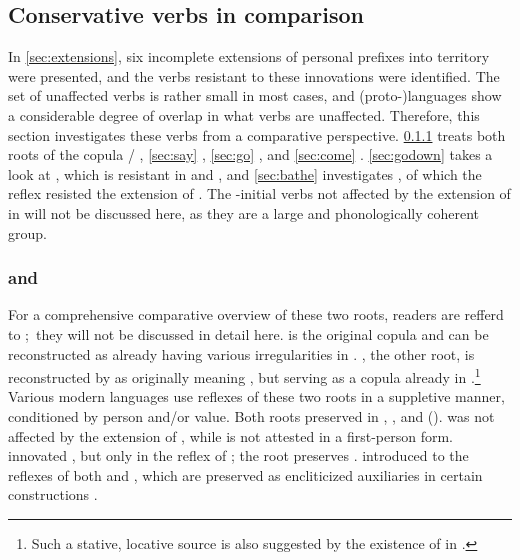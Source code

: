 \subsection{Conservative verbs in comparison}
\label{sec:verbs}
In \cref{sec:extensions}, six incomplete extensions of personal prefixes into  territory were presented, and the verbs resistant to these innovations were identified.
The set of unaffected verbs is rather small in most cases, and (proto-)languages show a considerable degree of overlap in what verbs are unaffected.
Therefore, this section investigates these verbs from a comparative perspective.
\cref{sec:be} treats both roots of the copula / , \cref{sec:say}  , \cref{sec:go}  , and \cref{sec:come}  .
\cref{sec:godown} takes a look at  , which is resistant in \PTir and \PPek, and  \cref{sec:bathe} investigates  , of which the \PPek reflex  resisted the extension of .
The -initial verbs not affected by the extension of  in \akuriyo {} will not be discussed here, as they are a large and phonologically coherent group.

\subsubsection{ and  }
\label{sec:be}
For a comprehensive comparative overview of these two roots, readers are refferd to \textcite[375--382]{gildea2018reconstructing}; they will not be discussed in detail here.
 is the original copula and can be reconstructed as already having various irregularities in \PC.
, the other root, is reconstructed by \textcites{meira2009property}{gildea2018reconstructing} as originally meaning , but serving as a copula already in \PC.\footnote{Such a stative, locative source is also suggested by the existence of   in \arara \parencite[196]{alves2017arara}.}
Various modern languages use reflexes of these two roots in a suppletive manner, conditioned by person and\slash{}or  value.
Both roots preserved   in \PPek, \PWai, and \PTir ().
\akuriyo {} was not affected by the extension of  , while  is not attested in a first-person form. 
\carijo innovated , but only in the reflex of  ; the  root preserves  .
\yukpa introduced  to the reflexes of both  and , which are preserved as encliticized auxiliaries in certain constructions .

